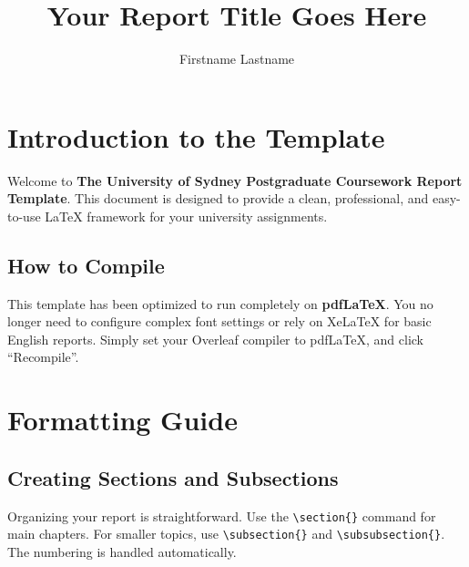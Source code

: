 \documentclass[twoside]{USYDReport}
\title{Your Report Title Goes Here} %
\author{Firstname Lastname}         %
\begin{document}
    \maketitle
    \makeToc
	
    
    \section{Introduction to the Template}
    
    Welcome to \textbf{The University of Sydney Postgraduate Coursework Report Template}. This document is designed to provide a clean, professional, and easy-to-use LaTeX framework for your university assignments. 
    
    \subsection{How to Compile}
    This template has been optimized to run completely on \textbf{pdfLaTeX}. You no longer need to configure complex font settings or rely on XeLaTeX for basic English reports. Simply set your Overleaf compiler to pdfLaTeX, and click ``Recompile''.
    
    \section{Formatting Guide}

    \subsection{Creating Sections and Subsections}
    Organizing your report is straightforward. Use the \verb|\section{}| command for main chapters. For smaller topics, use \verb|\subsection{}| and \verb|\subsubsection{}|. The numbering is handled automatically.
\end{document}
